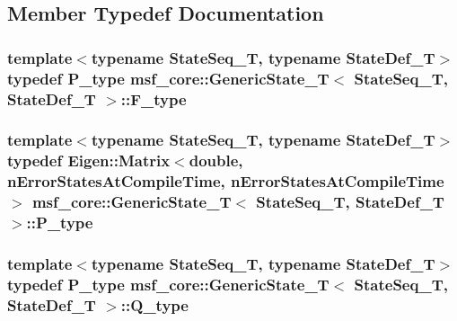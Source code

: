 \subsection{Member Typedef Documentation}
\hypertarget{structmsf__core_1_1GenericState__T_a9b665561d9157530cc72dab33ed0344f}{
\subsubsection[{F\-\_\-type}]{\setlength{\rightskip}{0pt plus 5cm}template$<$typename State\-Seq\-\_\-\-T, typename State\-Def\-\_\-\-T$>$ typedef {\bf P\-\_\-type} {\bf msf\-\_\-core\-::\-Generic\-State\-\_\-\-T}$<$ State\-Seq\-\_\-\-T, State\-Def\-\_\-\-T $>$\-::{\bf F\-\_\-type}}}\label{structmsf__core_1_1GenericState__T_a9b665561d9157530cc72dab33ed0344f}
\hypertarget{structmsf__core_1_1GenericState__T_ab6d971027f43219a480e910392b665c8}{
\subsubsection[{P\-\_\-type}]{\setlength{\rightskip}{0pt plus 5cm}template$<$typename State\-Seq\-\_\-\-T, typename State\-Def\-\_\-\-T$>$ typedef Eigen\-::\-Matrix$<$double, {\bf n\-Error\-States\-At\-Compile\-Time}, {\bf n\-Error\-States\-At\-Compile\-Time}$>$ {\bf msf\-\_\-core\-::\-Generic\-State\-\_\-\-T}$<$ State\-Seq\-\_\-\-T, State\-Def\-\_\-\-T $>$\-::{\bf P\-\_\-type}}}\label{structmsf__core_1_1GenericState__T_ab6d971027f43219a480e910392b665c8}
\hypertarget{structmsf__core_1_1GenericState__T_a2bd29a1ae1d6a6115a4dda70e285dc28}{
\subsubsection[{Q\-\_\-type}]{\setlength{\rightskip}{0pt plus 5cm}template$<$typename State\-Seq\-\_\-\-T, typename State\-Def\-\_\-\-T$>$ typedef {\bf P\-\_\-type} {\bf msf\-\_\-core\-::\-Generic\-State\-\_\-\-T}$<$ State\-Seq\-\_\-\-T, State\-Def\-\_\-\-T $>$\-::{\bf Q\-\_\-type}}}\label{structmsf__core_1_1GenericState__T_a2bd29a1ae1d6a6115a4dda70e285dc28}
